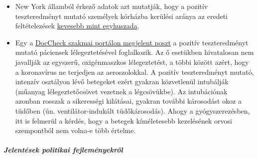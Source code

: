\begin{itemize}
{  gyakorol}, hogy változtasson stratégiáján.
\item
  New York államból érkező adatok azt mutatják, hogy a pozitív
  teszteredményt mutató személyek kórházba kerülési aránya az eredeti
  feltételezések
  \href{https://www.nytimes.com/2020/03/27/nyregion/new-rochelle-coronavirus.html}{kevesebb
  mint egyhuszada}.
\item
  Egy a
  \href{https://www.doccheck.com/de/detail/articles/26271-covid-19-beatmung-und-dann}{DocCheck
  szakmai portálon megjelent poszt} a pozitív teszteredményt mutató
  páciensek lélegeztetésével foglalkozik. Az ő esetükben hivatalosan nem
  javallják az egyszerű, oxigénmaszkos lélegeztetést, a többi között
  azért, hogy a koronavírus ne terjedjen az aeroszolokkal. A pozitív
  teszteredményt mutató, intenzív osztályon lévő betegeket ezért gyakran
  közvetlenül intubálják (műanyag lélegeztetőcsövet vezetnek a
  légcsövükbe). Az intubációnak azonban rosszak a sikerességi kilátásai,
  gyakran további károsodást okoz a tüdőben (ún. ventilátor-indukált
  tüdőkárosodás). Ahogy a gyógyszerezésben, itt is felmerül a kérdés,
  hogy a betegek kíméletesebb kezelésének orvosi szempontból nem volna-e
  több értelme.
\end{itemize}

\hypertarget{jelentuxe9sek-politikai-fejlemuxe9nyekrux151l}{%
\subparagraph{\texorpdfstring{\textbf{Jelentések politikai
fejleményekről}}{Jelentések politikai fejleményekről}}\label{jelentuxe9sek-politikai-fejlemuxe9nyekrux151l}}

